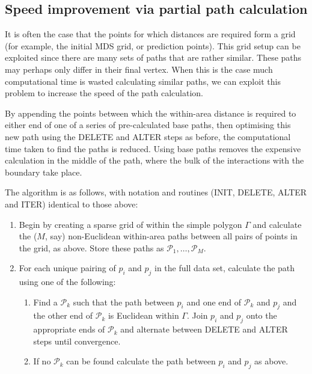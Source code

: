 \documentclass[useAMS, referee]{biom}
\begin{document}
\subsection*{Speed improvement via partial path calculation}

It is often the case that the points for which distances are required form a grid (for example, the initial MDS grid, or prediction points). This grid setup can be exploited since there are many sets of paths that are rather similar. These paths may perhaps only differ in their final vertex. When this is the case much computational time is wasted calculating similar paths, we can exploit this problem to increase the speed of the path calculation.

By appending the points between which the within-area distance is required to either end of one of a series of pre-calculated base paths, then optimising this new path using the DELETE and ALTER steps as before,  the computational time taken to find the paths is reduced. Using base paths removes the expensive calculation in the middle of the path, where the bulk of the interactions with the boundary take place.

The algorithm is as follows, with notation and routines (INIT, DELETE, ALTER and ITER) identical to those above:
\begin{enumerate}
 \item Begin by creating a sparse grid of within the simple polygon $\Gamma$ and calculate the ($M$, say) non-Euclidean within-area paths between all pairs of points in the grid, as above. Store these paths as $\mathcal{P}_1,\ldots, \mathcal{P}_M$.
\item For each unique pairing of $p_i$ and $p_j$ in the full data set, calculate the path using one of the following:
	\begin{enumerate}
	\item Find a $\mathcal{P}_k$ such that the path between $p_i$ and one end of $\mathcal{P}_k$ and $p_j$ and the other end of $\mathcal{P}_k$ is Euclidean within $\Gamma$. Join $p_i$ and $p_j$ onto the appropriate ends of $\mathcal{P}_k$ and alternate between DELETE and ALTER steps until convergence.
	\item If no $\mathcal{P}_k$ can be found calculate the path between $p_i$ and $p_j$ as above. 
	\end{enumerate}
\end{enumerate}
\end{document}
